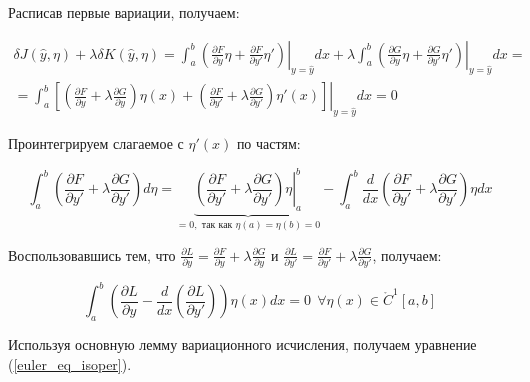 Расписав первые вариации, получаем:

\begin{multline*}
\delta J(\widehat{y}, \eta) + \lambda \delta K(\widehat{y}, \eta) = 
\int_a^b \left. \left( \frac{\partial F}{\partial y} \eta + 
\frac{\partial F}{\partial y'} \eta' \right) 
\right|_{y = \widehat{y}} dx + \lambda
\int_a^b \left. \left( \frac{\partial G}{\partial y} \eta + 
\frac{\partial G}{\partial y'} \eta' \right) \right|_{y = \widehat{y}} dx =
\\ =
\int_a^b \left. \left[
\left( 
\frac{\partial F}{\partial y} + \lambda \frac{\partial G}{\partial y}
\right) \eta(x) + 
\left( 
\frac{\partial F}{\partial y'} + \lambda \frac{\partial G}{\partial y'}
\right) \eta'(x)
\right] \right|_{y = \widehat{y}} dx = 0
\end{multline*}

Проинтегрируем слагаемое с $\eta'(x)$ по частям:

$$
\int_a^b \left( 
\frac{\partial F}{\partial y'} + \lambda
\frac{\partial G}{\partial y'}
\right) d \eta = 
\underbrace{\left. \left( \frac{\partial F}{\partial y'} + \lambda
\frac{\partial G}{\partial y'} \right) \eta \right|_a^b}
_{= 0, \text{ так как } \eta(a) = \eta(b) = 0} - 
\int_a^b \frac{d}{dx} \left(
\frac{\partial F}{\partial y'} + \lambda
\frac{\partial G}{\partial y'}
\right) \eta dx
$$

Воспользовавшись тем, что 
$\frac{\partial L}{\partial y} = \frac{\partial F}{\partial y} + \lambda
\frac{\partial G}{\partial y}$ и 
$\frac{\partial L}{\partial y'} = \frac{\partial F}{\partial y'} + \lambda
\frac{\partial G}{\partial y'}$, получаем:

$$
\int_a^b \left( \frac{\partial L}{\partial y} - \frac{d}{dx}
\left( \frac{\partial L}{\partial y'} \right)
\right) \eta(x) dx = 0 \ \ 
\forall \eta(x) \in \mathring{C}^1 [a, b]
$$

Используя основную лемму вариационного исчисления, получаем
уравнение (\ref{euler_eq_isoper}).
